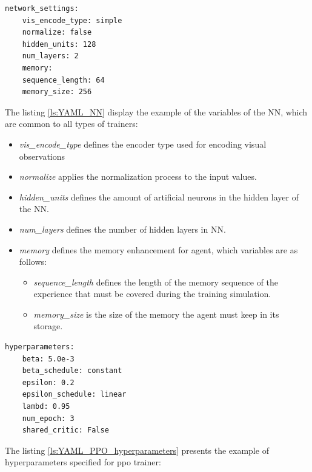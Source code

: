 \begin{lstlisting}[caption={Configuration of the neural network.}, label={ls:YAML_NN}]
	network_settings:
	vis_encode_type: simple
	normalize: false
	hidden_units: 128
	num_layers: 2
	memory:
	sequence_length: 64
	memory_size: 256
\end{lstlisting}
The listing \ref{ls:YAML_NN} display the example of the variables of the NN, which are common to all types of trainers:
\begin{itemize}
	\item \textit{vis\_encode\_type} defines the encoder type used for encoding visual observations
	\item \textit{normalize} applies the normalization process to the input values. 
	\item \textit{hidden\_units} defines the amount of artificial neurons in the hidden layer of the NN.
	\item \textit{num\_layers} defines the number of hidden layers in NN.
	\item \textit{memory} defines the memory enhancement for agent, which variables are as follows:
	\begin{itemize}
		\item \textit{sequence\_length} defines the length of the memory sequence of the experience that must be covered during the training simulation.
		\item \textit{memory\_size} is the size of the memory the agent must keep in its storage.
	\end{itemize}
\end{itemize}

\begin{lstlisting}[caption={PPO-specific hyperparameters.}, label={ls:YAML_PPO_hyperparameters}]
	hyperparameters:
	beta: 5.0e-3
	beta_schedule: constant
	epsilon: 0.2
	epsilon_schedule: linear
	lambd: 0.95
	num_epoch: 3
	shared_critic: False
\end{lstlisting}
The listing \ref{ls:YAML_PPO_hyperparameters} presents the example of hyperparameters specified for ppo trainer:

